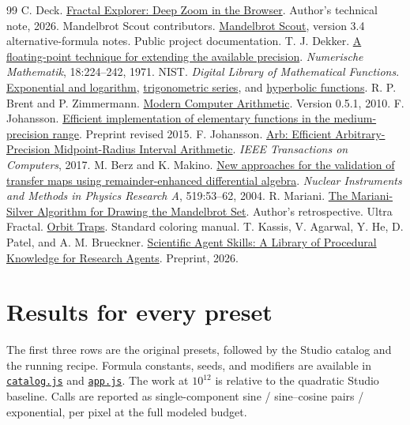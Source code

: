 \documentclass[11pt,a4paper]{article}
\numberwithin{equation}{section}
\newcommand{\code}[1]{\texttt{#1}}
\begin{document}
\begin{thebibliography}{99}
 C. Deck. \href{https://www.charlesdeck.com/blog/2026-05-09-fractal-webgpu-explorer}{Fractal Explorer: Deep Zoom in the Browser}. Author's technical note, 2026.
 Mandelbrot Scout contributors. \href{https://github.com/grubertw/mandelbrot_scout}{Mandelbrot Scout}, version 3.4 alternative-formula notes. Public project documentation.
 T. J. Dekker. \href{https://doi.org/10.1007/BF01397083}{A floating-point technique for extending the available precision}. \emph{Numerische Mathematik}, 18:224--242, 1971.
 NIST. \emph{Digital Library of Mathematical Functions}. \href{https://dlmf.nist.gov/4.2}{Exponential and logarithm}, \href{https://dlmf.nist.gov/4.19}{trigonometric series}, and \href{https://dlmf.nist.gov/4.28}{hyperbolic functions}.
 R. P. Brent and P. Zimmermann. \href{https://arxiv.org/abs/1004.4710}{Modern Computer Arithmetic}. Version 0.5.1, 2010.
 F. Johansson. \href{https://arxiv.org/abs/1410.7176}{Efficient implementation of elementary functions in the medium-precision range}. Preprint revised 2015.
 F. Johansson. \href{https://arxiv.org/abs/1611.02831}{Arb: Efficient Arbitrary-Precision Midpoint-Radius Interval Arithmetic}. \emph{IEEE Transactions on Computers}, 2017.
 M. Berz and K. Makino. \href{https://www.bmtdynamics.org/pub/papers/TMCPO6/TMCPO6.pdf}{New approaches for the validation of transfer maps using remainder-enhanced differential algebra}. \emph{Nuclear Instruments and Methods in Physics Research A}, 519:53--62, 2004.
 R. Mariani. \href{https://ricomariani.medium.com/the-mariani-silver-algorithm-for-drawing-the-mandelbrot-set-a71e31bc20b6}{The Mariani-Silver Algorithm for Drawing the Mandelbrot Set}. Author's retrospective.
 Ultra Fractal. \href{https://www.ultrafractal.com/help/coloring/standard/orbittraps.html}{Orbit Traps}. Standard coloring manual.
 T. Kassis, V. Agarwal, Y. He, D. Patel, and A. M. Brueckner. \href{https://arxiv.org/abs/2609.00065}{Scientific Agent Skills: A Library of Procedural Knowledge for Research Agents}. Preprint, 2026.
\end{thebibliography}
\endgroup

\clearpage
\appendix
\section{Results for every preset}\label{sec:catalog}

The first three rows are the original presets, followed by the Studio
catalog and the running recipe. Formula constants, seeds, and
modifiers are available in
\href{../dist/catalog.js}{\code{catalog.js}} and
\href{../dist/app.js}{\code{app.js}}. The work at \(10^{12}\) is
relative to the quadratic Studio baseline. Calls are reported as
single-component sine / sine--cosine pairs / exponential, per pixel
at the full modeled budget.
\end{document}

